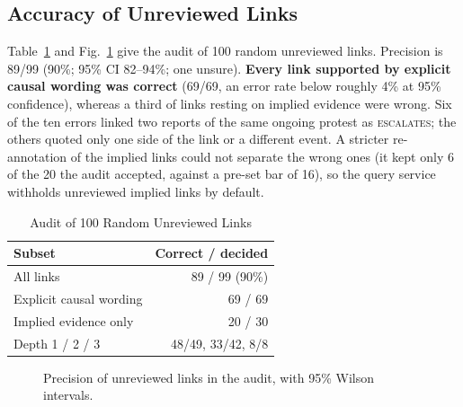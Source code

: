 \documentclass[conference]{IEEEtran}
\begin{document}
\subsection{Accuracy of Unreviewed Links}
Table~\ref{tab:spot} and Fig.~\ref{fig:precision} give the audit of 100 random unreviewed links.
Precision is 89/99 (90\%; 95\% CI 82--94\%; one unsure). \textbf{Every link supported by explicit
causal wording was correct} (69/69, an error rate below roughly 4\% at 95\% confidence), whereas a
third of links resting on implied evidence were wrong. Six of the ten errors linked two reports of
the same ongoing protest as \textsc{escalates}; the others quoted only one side of the link or a
different event. A stricter re-annotation of the implied links could not separate the wrong ones (it
kept only 6 of the 20 the audit accepted, against a pre-set bar of 16), so the query service withholds
unreviewed implied links by default.

\begin{table}[t]
\caption{Audit of 100 Random Unreviewed Links}
\label{tab:spot}
\centering
\footnotesize
\begin{tabular}{@{}lr@{}}
\toprule
Subset & Correct / decided \\
\midrule
All links & 89 / 99 (90\%) \\
Explicit causal wording & 69 / 69 \\
Implied evidence only & 20 / 30 \\
Depth 1 / 2 / 3 & 48/49, 33/42, 8/8 \\
\bottomrule
\end{tabular}
\end{table}

\begin{figure}[t]
\centering
{}
\caption{Precision of unreviewed links in the audit, with 95\% Wilson intervals.}
\label{fig:precision}
\end{figure}
\end{document}
